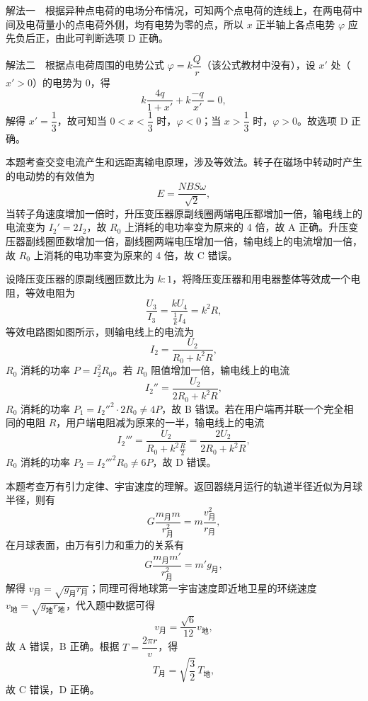 \begin{answer}
解法一　根据异种点电荷的电场分布情况，可知两个点电荷的连线上，在两电荷中间及电荷量小的点电荷外侧，均有电势为零的点，所以 $x$ 正半轴上各点电势 $\varphi$ 应先负后正，由此可判断选项 D 正确。

解法二　根据点电荷周围的电势公式 $\varphi=k\dfrac{Q}{r}$（该公式教材中没有），设 $x'$ 处（$x'>0$）的电势为 0，得
\[
  k\frac{4q}{1+x'}+k\frac{-q}{x'}=0,
\]
解得 $x'=\dfrac{1}{3}$，故可知当 $0<x<\dfrac{1}{3}$ 时，$\varphi<0$；当 $x>\dfrac{1}{3}$ 时，$\varphi>0$。故选项 D 正确。
\end{answer}

\begin{answer}
本题考查交变电流产生和远距离输电原理，涉及等效法。转子在磁场中转动时产生的电动势的有效值为
\[
  E=\frac{NBS\omega}{\sqrt{2}},
\]
当转子角速度增加一倍时，升压变压器原副线圈两端电压都增加一倍，输电线上的电流变为 $I_{2}'=2I_{2}$，故 $R_{0}$ 上消耗的电功率变为原来的 4 倍，故 A 正确。升压变压器副线圈匝数增加一倍，副线圈两端电压增加一倍，输电线上的电流增加一倍，故 $R_{0}$ 上消耗的电功率变为原来的 4 倍，故 C 错误。

设降压变压器的原副线圈匝数比为 $k:1$，将降压变压器和用电器整体等效成一个电阻，等效电阻为
\[
  \frac{U_{3}}{I_{3}}=\frac{kU_{4}}{\frac{1}{k}I_{4}}=k^{2}R,
\]
等效电路图如图所示，则输电线上的电流为
\[
  I_{2}=\frac{U_{2}}{R_{0}+k^{2}R},
\]
$R_{0}$ 消耗的功率 $P=I_{2}^{2}R_{0}$。若 $R_{0}$ 阻值增加一倍，输电线上的电流
\[
  I_{2}''=\frac{U_{2}}{2R_{0}+k^{2}R},
\]
$R_{0}$ 消耗的功率 $P_{1}=I_{2}''^{2}\cdot 2R_{0}\ne 4P$，故 B 错误。若在用户端再并联一个完全相同的电阻 $R$，用户端电阻减为原来的一半，输电线上的电流
\[
  I_{2}'''=\frac{U_{2}}{R_{0}+k^{2}\frac{R}{2}}=\frac{2U_{2}}{2R_{0}+k^{2}R},
\]
$R_{0}$ 消耗的功率 $P_{2}=I_{2}'''^{2}R_{0}\ne 6P$，故 D 错误。

\end{answer}

\begin{answer}
本题考查万有引力定律、宇宙速度的理解。返回器绕月运行的轨道半径近似为月球半径，则有
\[
  G\frac{m_{\text{月}}m}{r_{\text{月}}^{2}}=m\frac{v_{\text{月}}^{2}}{r_{\text{月}}},
\]
在月球表面，由万有引力和重力的关系有
\[
  G\frac{m_{\text{月}}m'}{r_{\text{月}}^{2}}=m'g_{\text{月}},
\]
解得 $v_{\text{月}}=\sqrt{g_{\text{月}}r_{\text{月}}}$；同理可得地球第一宇宙速度即近地卫星的环绕速度 $v_{\text{地}}=\sqrt{g_{\text{地}}r_{\text{地}}}$，代入题中数据可得
\[
  v_{\text{月}}=\frac{\sqrt{6}}{12}v_{\text{地}},
\]
故 A 错误，B 正确。根据 $T=\dfrac{2\pi r}{v}$，得
\[
  T_{\text{月}}=\sqrt{\frac{3}{2}}\,T_{\text{地}},
\]
故 C 错误，D 正确。
\end{answer}


